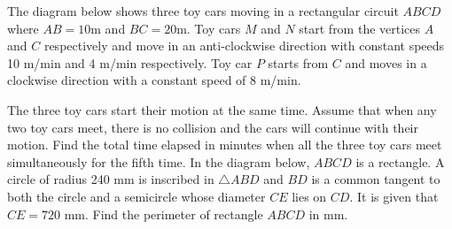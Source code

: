 \begin{enumerate}
\begin{center}
    \end{center}
    \hyperrefitem[Q::2024-J-1-24] The diagram below shows three toy cars moving in a rectangular circuit $ABCD$ where $AB = 10$m and $BC = 20$m. Toy cars $M$ and $N$ start from the vertices $A$ and $C$ respectively and move in an anti-clockwise direction with constant speeds 10 m/min and 4 m/min respectively. Toy car $P$ starts from $C$ and moves in a clockwise direction with a constant speed of 8 m/min.
    \begin{center}
    \end{center}
    The three toy cars start their motion at the same time. Assume that when any two toy cars meet, there is no collision and the cars will continue with their motion. Find the total time elapsed in minutes when all the three toy cars meet simultaneously for the fifth time.
    \clearpage
    \hyperrefitem[Q::2024-J-1-25] In the diagram below, $ABCD$ is a rectangle. A circle of radius 240 mm is inscribed in $\triangle ABD$ and $BD$ is a common tangent to both the circle and a semicircle whose diameter $CE$ lies on $CD$. It is given that $CE = 720$ mm. Find the perimeter of rectangle $ABCD$ in mm.


\end{enumerate}
